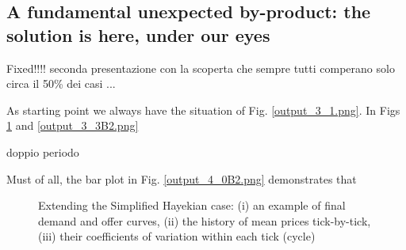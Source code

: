 \documentclass[10pt]{report}
\begin{document}
\begin{appendices}
\section{A fundamental unexpected by-product: the solution is here, under our eyes}

Fixed!!!!
seconda presentazione con la scoperta che sempre tutti comperano solo circa il 50\% dei casi ...

As starting point we always have the situation of Fig. \ref{output_3_1.png}. In Figs \ref{output_3_2B2.png} and \ref{output_3_3B2.png}

doppio periodo

Must of all, the bar plot in Fig. \ref{output_4_0B2.png} demonstrates that

\begin{figure}[H]
\begin{center}
\caption{Extending the Simplified Hayekian case: (i) an example of final demand and offer curves, (ii) the history of mean prices tick-by-tick, (iii) their coefficients of variation within each tick (cycle)}
\label{output_3_2B2.png}
\end{center}
\end{figure}


\end{appendices}
\end{document}
